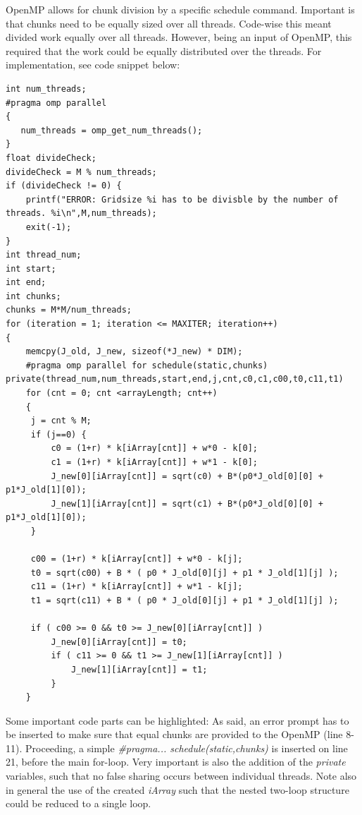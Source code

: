 \documentclass[12pt]{article}
\begin{document}
OpenMP allows for chunk division by a specific schedule command. Important is that chunks need to be equally sized over all threads. Code-wise this meant divided work equally over all threads. However, being an input of OpenMP, this required that the work could be equally distributed over the threads. For implementation, see code snippet below:

\begin{lstlisting}[caption={Structuring of one for-loop, with OpenMP chunk division}, label={lst:L5}]
int num_threads;
#pragma omp parallel
{
   num_threads = omp_get_num_threads();
}
float divideCheck;
divideCheck = M % num_threads;
if (divideCheck != 0) {
    printf("ERROR: Gridsize %i has to be divisble by the number of threads. %i\n",M,num_threads);
    exit(-1);
}
int thread_num;
int start;
int end;
int chunks;
chunks = M*M/num_threads;
for (iteration = 1; iteration <= MAXITER; iteration++)
{
    memcpy(J_old, J_new, sizeof(*J_new) * DIM);
    #pragma omp parallel for schedule(static,chunks) private(thread_num,num_threads,start,end,j,cnt,c0,c1,c00,t0,c11,t1)
    for (cnt = 0; cnt <arrayLength; cnt++)
    {
     j = cnt % M; 
     if (j==0) {
	     c0 = (1+r) * k[iArray[cnt]] + w*0 - k[0];
         c1 = (1+r) * k[iArray[cnt]] + w*1 - k[0];
         J_new[0][iArray[cnt]] = sqrt(c0) + B*(p0*J_old[0][0] + p1*J_old[1][0]);            
         J_new[1][iArray[cnt]] = sqrt(c1) + B*(p0*J_old[0][0] + p1*J_old[1][0]);
     }
             
     c00 = (1+r) * k[iArray[cnt]] + w*0 - k[j];
     t0 = sqrt(c00) + B * ( p0 * J_old[0][j] + p1 * J_old[1][j] );
     c11 = (1+r) * k[iArray[cnt]] + w*1 - k[j];
     t1 = sqrt(c11) + B * ( p0 * J_old[0][j] + p1 * J_old[1][j] );
 
     if ( c00 >= 0 && t0 >= J_new[0][iArray[cnt]] )
         J_new[0][iArray[cnt]] = t0;
         if ( c11 >= 0 && t1 >= J_new[1][iArray[cnt]] )
             J_new[1][iArray[cnt]] = t1;
         }
    }
\end{lstlisting}

Some important code parts can be highlighted: As said, an error prompt has to be inserted to make sure that equal chunks are provided to the OpenMP (line 8-11). Proceeding, a simple \emph{\color{Plum} \#pragma... schedule(static,chunks)} is inserted on line 21, before the main for-loop. Very important is also the addition of the \emph{\color{Plum} private} variables, such that no false sharing occurs between individual threads. Note also in general the use of the created \emph{iArray} such that the nested two-loop structure could be reduced to a single loop. 
\end{document}
